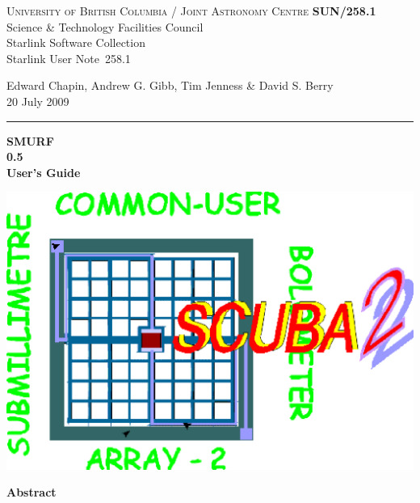 \documentclass[twoside,11pt]{article}
\newcommand{\stardoccategory}  {Starlink User Note}
\newcommand{\stardocinitials}  {SUN}
\newcommand{\stardocnumber}    {258.1}
\newcommand{\stardocauthors}   {Edward Chapin, Andrew G. Gibb, Tim Jenness \& David S. Berry}
\newcommand{\stardocdate}      {20 July 2009}
\newcommand{\stardoctitle}     {SMURF}
\newcommand{\stardocversion}   {0.5}
\newcommand{\stardocmanual}    {User's Guide}
\newcommand{\stardocname}{\stardocinitials /\stardocnumber}
\newenvironment{latexonly}{}{}
\renewcommand{\_}{\texttt{\symbol{95}}}
\begin{document}
\thispagestyle{empty}

\begin{latexonly}
   \textsc{University of British Columbia} / \textsc{Joint Astronomy Centre} \hfill \textbf{\stardocname}\\
   {\large Science \& Technology Facilities Council}\\
   {\large Starlink Software Collection\\}
   {\large \stardoccategory\ \stardocnumber}
   \begin{flushright}
   \stardocauthors\\
   \stardocdate
   \end{flushright}
   \vspace{-4mm}
   \rule{\textwidth}{0.5mm}
   \vspace{5mm}
   \begin{center}
   {\Huge\textbf{\stardoctitle \\ [2.5ex]}}
   {\LARGE\textbf{\stardocversion \\ [4ex]}}
   {\Huge\textbf{\stardocmanual}}
   \end{center}
   \vspace{5mm}

\begin{center}
\includegraphics[scale=0.3]{sun258_logo.eps}
\end{center}

   \vspace{10mm}
   \begin{center}
      {\Large\textbf{Abstract}}
   \end{center}
\end{latexonly}
\end{document}
